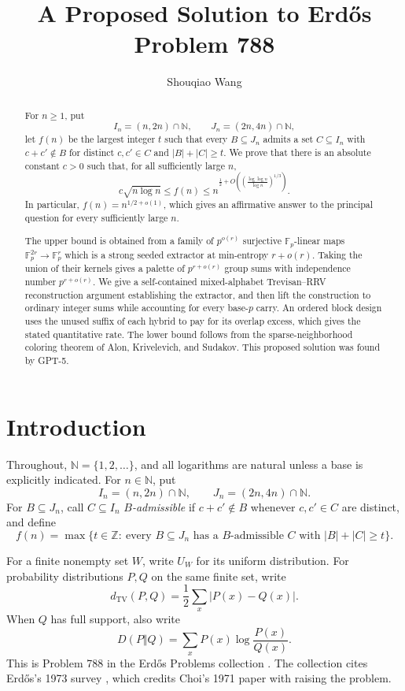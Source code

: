 \documentclass[11pt]{article}
\title{A Proposed Solution to Erd\H{o}s Problem 788}
\author{Shouqiao Wang}
\affil{Columbia University\hspace{2.5em}Multiscalar Intelligence}
\date{}
\numberwithin{equation}{section}
\theoremstyle{definition}
\theoremstyle{remark}
\newcommand{\F}{\mathbb F}
\newcommand{\N}{\mathbb N}
\newcommand{\TV}{d_{\mathrm{TV}}}
\begin{document}
\maketitle

\begin{abstract}
For $n\ge1$, put
\[
 I_n=(n,2n)\cap\N,\qquad J_n=(2n,4n)\cap\N,
\]
let $f(n)$ be the largest integer $t$ such that every $B\subseteq J_n$
admits a set $C\subseteq I_n$ with $c+c'\notin B$ for distinct
$c,c'\in C$ and $|B|+|C|\ge t$.
We prove that there is an absolute constant $c>0$ such that, for all
sufficiently large $n$,
\[
 c\sqrt{n\log n}\le f(n)
 \le n^{\frac12+O\!\left(
   \left(\frac{\log\log n}{\log n}\right)^{1/3}\right)}.
\]
In particular, $f(n)=n^{1/2+o(1)}$, which gives an affirmative answer to
the principal question for every sufficiently large $n$.

The upper bound is obtained from a family of $p^{o(r)}$ surjective
$\F_p$-linear maps $\F_p^{2r}\to\F_p^r$ which is a strong seeded
extractor at min-entropy $r+o(r)$.  Taking the union of their kernels
gives a palette of $p^{r+o(r)}$ group sums with independence number
$p^{r+o(r)}$.  We give a self-contained mixed-alphabet Trevisan--RRV
reconstruction argument establishing the extractor, and then lift the
construction to ordinary integer sums while accounting for every base-$p$
carry.  An ordered block design uses the unused suffix of each hybrid to
pay for its overlap excess, which gives the stated quantitative rate.
The lower bound follows from the sparse-neighborhood coloring
theorem of Alon, Krivelevich, and Sudakov.
This proposed solution was found by GPT-5.
\end{abstract}

\section{Introduction}\label{sec:introduction}

Throughout, $\N=\{1,2,\ldots\}$, and all logarithms are natural unless a
base is explicitly indicated.  For $n\in\N$, put
\[
 I_n=(n,2n)\cap\N,
 \qquad
 J_n=(2n,4n)\cap\N.
\]
For $B\subseteq J_n$, call $C\subseteq I_n$ \emph{$B$-admissible} if
$c+c'\notin B$ whenever $c,c'\in C$ are distinct, and define
\[
 f(n)=\max\bigl\{t\in\mathbb Z:\ 
 \text{every $B\subseteq J_n$ has a $B$-admissible $C$ with
 $|B|+|C|\ge t$}\bigr\}.
\]

For a finite nonempty set $W$, write $U_W$ for its uniform distribution.
For probability distributions $P,Q$ on the same finite set, write
\[
 \TV(P,Q)=\frac12\sum_x|P(x)-Q(x)|.
\]
When $Q$ has full support, also write
\[
 D(P\Vert Q)=\sum_x P(x)\log\frac{P(x)}{Q(x)}.
\]
This is Problem 788 in the Erd\H{o}s Problems collection
\cite{ErdosProblems788}.  The collection cites Erd\H{o}s's 1973 survey
\cite{Erdos1973}, which credits Choi's 1971 paper \cite{Choi1971} with
raising the problem.
\end{document}

